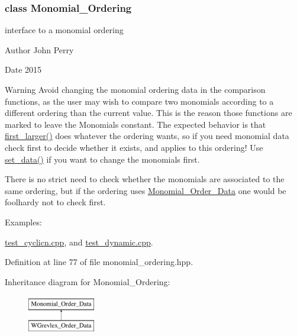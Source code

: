 \subsubsection{class Monomial\+\_\+\+Ordering}
interface to a monomial ordering 

\begin{DoxyAuthor}{Author}
John Perry 
\end{DoxyAuthor}
\begin{DoxyDate}{Date}
2015 
\end{DoxyDate}
\begin{DoxyWarning}{Warning}
Avoid changing the monomial ordering data in the comparison functions, as the user may wish to compare two monomials according to a different ordering than the current value. This is the reason those functions are marked to leave the Monomials constant. The expected behavior is that \hyperlink{group__orderinggroup_aed41fe82e1ca5cd287a93d287fee7c20}{first\+\_\+larger()} does whatever the ordering wants, so if you need monomial data check first to decide whether it exists, and applies to this ordering! Use \hyperlink{group__orderinggroup_a22b08dffd1cdf3a655ca18d604cfcee1}{set\+\_\+data()} if you want to change the monomials first.

There is no strict need to check whether the monomials are associated to the same ordering, but if the ordering uses \hyperlink{group__orderinggroup_class_monomial___order___data}{Monomial\+\_\+\+Order\+\_\+\+Data} one would be foolhardy not to check first. 
\end{DoxyWarning}
\begin{Desc}
\item[Examples\+: ]\par
\hyperlink{test_cyclicn_8cpp-example}{test\+\_\+cyclicn.\+cpp}, and \hyperlink{test_dynamic_8cpp-example}{test\+\_\+dynamic.\+cpp}.\end{Desc}


Definition at line 77 of file monomial\+\_\+ordering.\+hpp.

Inheritance diagram for Monomial\+\_\+\+Ordering\+:\begin{figure}[H]
\begin{center}
\leavevmode
\includegraphics[height=1.581921cm]{group__orderinggroup}
\end{center}
\end{figure}
